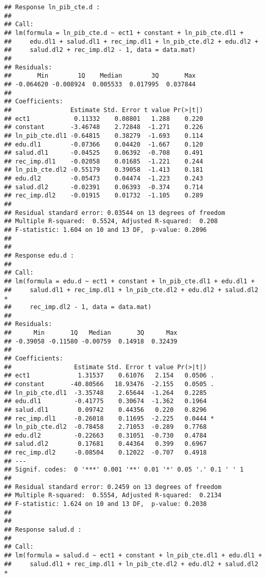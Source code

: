 \documentclass[]{book}
\theoremstyle{definition}
\theoremstyle{definition}
\theoremstyle{definition}
\theoremstyle{remark}
\begin{document}
\begin{verbatim}
## Response ln_pib_cte.d :
## 
## Call:
## lm(formula = ln_pib_cte.d ~ ect1 + constant + ln_pib_cte.dl1 + 
##     edu.dl1 + salud.dl1 + rec_imp.dl1 + ln_pib_cte.dl2 + edu.dl2 + 
##     salud.dl2 + rec_imp.dl2 - 1, data = data.mat)
## 
## Residuals:
##       Min        1Q    Median        3Q       Max 
## -0.064620 -0.008924  0.005533  0.017995  0.037844 
## 
## Coefficients:
##                Estimate Std. Error t value Pr(>|t|)
## ect1            0.11332    0.08801   1.288    0.220
## constant       -3.46748    2.72848  -1.271    0.226
## ln_pib_cte.dl1 -0.64815    0.38279  -1.693    0.114
## edu.dl1        -0.07366    0.04420  -1.667    0.120
## salud.dl1      -0.04525    0.06392  -0.708    0.491
## rec_imp.dl1    -0.02058    0.01685  -1.221    0.244
## ln_pib_cte.dl2 -0.55179    0.39058  -1.413    0.181
## edu.dl2        -0.05473    0.04474  -1.223    0.243
## salud.dl2      -0.02391    0.06393  -0.374    0.714
## rec_imp.dl2    -0.01915    0.01732  -1.105    0.289
## 
## Residual standard error: 0.03544 on 13 degrees of freedom
## Multiple R-squared:  0.5524, Adjusted R-squared:  0.208 
## F-statistic: 1.604 on 10 and 13 DF,  p-value: 0.2096
## 
## 
## Response edu.d :
## 
## Call:
## lm(formula = edu.d ~ ect1 + constant + ln_pib_cte.dl1 + edu.dl1 + 
##     salud.dl1 + rec_imp.dl1 + ln_pib_cte.dl2 + edu.dl2 + salud.dl2 + 
##     rec_imp.dl2 - 1, data = data.mat)
## 
## Residuals:
##      Min       1Q   Median       3Q      Max 
## -0.39058 -0.11580 -0.00759  0.14918  0.32439 
## 
## Coefficients:
##                 Estimate Std. Error t value Pr(>|t|)  
## ect1             1.31537    0.61076   2.154   0.0506 .
## constant       -40.80566   18.93476  -2.155   0.0505 .
## ln_pib_cte.dl1  -3.35748    2.65644  -1.264   0.2285  
## edu.dl1         -0.41775    0.30674  -1.362   0.1964  
## salud.dl1        0.09742    0.44356   0.220   0.8296  
## rec_imp.dl1     -0.26018    0.11695  -2.225   0.0444 *
## ln_pib_cte.dl2  -0.78458    2.71053  -0.289   0.7768  
## edu.dl2         -0.22663    0.31051  -0.730   0.4784  
## salud.dl2        0.17681    0.44364   0.399   0.6967  
## rec_imp.dl2     -0.08504    0.12022  -0.707   0.4918  
## ---
## Signif. codes:  0 '***' 0.001 '**' 0.01 '*' 0.05 '.' 0.1 ' ' 1
## 
## Residual standard error: 0.2459 on 13 degrees of freedom
## Multiple R-squared:  0.5554, Adjusted R-squared:  0.2134 
## F-statistic: 1.624 on 10 and 13 DF,  p-value: 0.2038
## 
## 
## Response salud.d :
## 
## Call:
## lm(formula = salud.d ~ ect1 + constant + ln_pib_cte.dl1 + edu.dl1 + 
##     salud.dl1 + rec_imp.dl1 + ln_pib_cte.dl2 + edu.dl2 + salud.dl2 + 

\end{verbatim}
\end{document}

